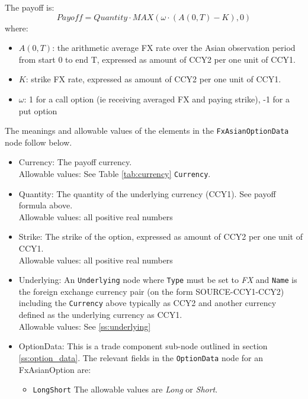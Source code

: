 The payoff is: 
$$
Payoff = Quantity\cdot MAX(\omega\cdot(A(0,T) - K),0)
$$
where:
\begin{itemize}
\item $A(0,T)$: the arithmetic average FX rate over the Asian observation period from start 0 to end T, expressed as amount of CCY2 per one unit of CCY1.
\item $K$: strike FX rate, expressed as amount of CCY2 per one unit of CCY1.
\item $\omega$: 1 for a call option (ie receiving averaged FX and paying strike), -1 for a put option
\end{itemize}


The meanings and allowable values of the elements in the \lstinline!FxAsianOptionData!  node follow below.

\begin{itemize}
	\item Currency: The payoff currency. \\  %
	Allowable values: See Table \ref{tab:currency} \lstinline!Currency!.
	\item Quantity: The quantity of the underlying currency (CCY1). See payoff formula above.  \\
	Allowable values: all positive real numbers
	\item Strike: The strike of the option, expressed as amount of CCY2 per one unit of CCY1. \\
	Allowable values: all positive real numbers
	\item Underlying: An \lstinline!Underlying! node where \lstinline!Type! must be set to \emph{FX} and \lstinline!Name! is the foreign exchange currency pair (on the form SOURCE-CCY1-CCY2) including the \lstinline!Currency! above typically as CCY2 and another currency defined as the underlying currency as CCY1.   \\
	Allowable values:  See \ref{ss:underlying}
	
	\item OptionData:  This is a trade component sub-node outlined in section \ref{ss:option_data}.  The relevant fields in the \lstinline!OptionData! node for an FxAsianOption are:
	
	\begin{itemize}
	
	\item \lstinline!LongShort! The allowable values are \emph{Long} or \emph{Short}.
	

\end{itemize}
\end{itemize}
